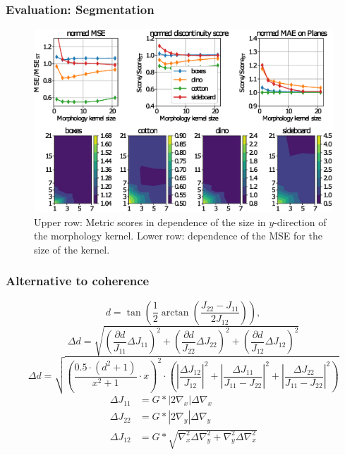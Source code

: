 \documentclass[11pt]{beamer}
\begin{document}
\begin{frame}
\frametitle{Evaluation: Segmentation}

\begin{figure}
	\includegraphics[width=1\linewidth]{images/thresh_segm_morph}
	\caption[Segmentation of Epi dependence on the morphology kernel]{Upper row: Metric scores in dependence of the size in $y$-direction of the morphology kernel. Lower row: dependence of the MSE for the size of the kernel.}
\end{figure}
\end{frame}


\begin{frame}
\frametitle{Alternative to coherence}
\begin{equation}\label{eq:disparity2}
d = \tan\left(\frac{1}{2} \arctan\left( \frac{J_{22}-J_{11}}{2J_{12}}\right)\right),
\end{equation}
\begin{equation}\label{eq:err_d}
\Delta d = \sqrt{\left(\frac{\partial d}{J_{11}}  \Delta J_{11}\right)^2 + \left(\frac{\partial d}{J_{22}}  \Delta J_{22}\right)^2 + \left(\frac{\partial d}{J_{12}} \Delta J_{12}\right)^2 }
\end{equation}
\begin{equation}\label{eq:deviation_d}
\Delta d =\sqrt{\left(\frac{0.5\cdot(d^2+1)}{x^2+1}\cdot x\right)^2 \cdot \left(\left|\frac{\Delta J_{12}}{J_{12}}\right|^2 + \left|\frac{\Delta J_{11}}{J_{11}-J_{22}}\right|^2 + \left|\frac{\Delta J_{22}}{J_{11}-J_{22}}\right|^2\right)}
\end{equation}
 \begin{align}\label{eq:std_struct}
\Delta J_{11} &= G *|2\nabla_x|\Delta\nabla_x\\
\Delta J_{22} &= G *|2\nabla_y|\Delta\nabla_y\\
\Delta J_{12} &= G *\sqrt{\nabla_x^2\Delta\nabla_y^2 + \nabla_y^2\Delta\nabla_x^2}
\end{align}
\end{frame}
\end{document}
